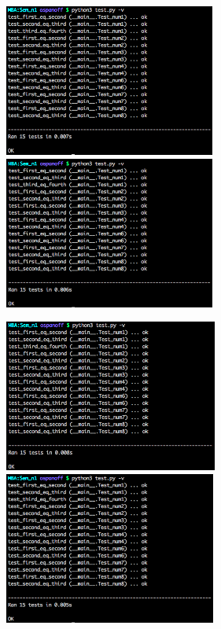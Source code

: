 \documentclass[12pt, a4paper]{article}
\begin{document}
			\begin{center}
				\includegraphics[height=5cm]{test/3.png}
				\includegraphics[height=5cm]{test/4.png}
			\end{center}

			\begin{center}
				\includegraphics[height=5cm]{test/5.png}
				\includegraphics[height=5cm]{test/6.png}
			\end{center}
\end{document}
